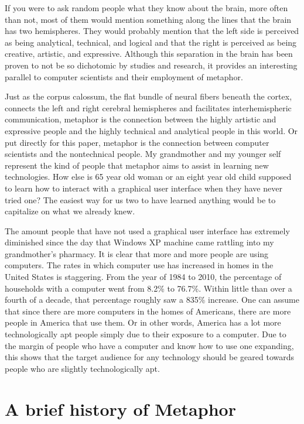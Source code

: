 \documentclass[11pt, oneside]{article}   	%
\begin{document}
If you were to ask random people what they know about the brain, more often than not, most of them would mention something along the lines that the brain has two hemispheres. They would probably mention that the left side is perceived as being analytical, technical, and logical and that the right is perceived as being creative, artistic, and expressive. Although this separation in the brain has been proven to not be so dichotomic by studies and research, it provides an interesting parallel to computer scientists and their employment of metaphor.

Just as the corpus calossum, the flat bundle of neural fibers beneath the cortex, connects the left and right cerebral hemispheres and facilitates interhemispheric communication, metaphor is the connection between the highly artistic and expressive people and the highly  technical and analytical people in this world. Or put directly for this paper, metaphor is the connection between computer scientists and the nontechnical people. My grandmother and my younger self represent the kind of people that metaphor aims to assist in learning new technologies. How else is 65 year old woman or an eight year old child supposed to learn how to interact with a graphical user interface when they have never tried one? The easiest way for us two to have learned anything would be to capitalize on what we already knew.

The amount people that have not used a graphical user interface has extremely diminished since the day that Windows XP machine came rattling into my grandmother's pharmacy. It is clear that more and more people are using computers. The rates in which computer use has increased in homes in the United States is staggering. From the year of 1984 to 2010, the percentage of households with a computer went from 8.2\% to 76.7\%. Within little than over a fourth of a decade, that percentage roughly saw a 835\% increase. \cite{computer-use}
One can assume that since there are more computers in the homes of Americans, there are more people in America that use them. Or in other words, America has a lot more technologically apt people simply due to their exposure to a computer. Due to the margin of people who have a computer and know how to use one expanding, this shows that the target audience for any technology should be geared towards people who are slightly technologically apt.

\section{A brief history of Metaphor}
\end{document}
